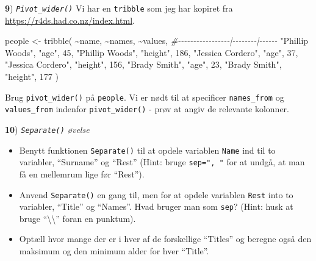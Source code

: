 \documentclass[
]{book}
\newenvironment{Shaded}{\begin{snugshade}}{\end{snugshade}}
\newcommand{\CommentTok}[1]{\textcolor[rgb]{0.56,0.35,0.01}{\textit{#1}}}
\newcommand{\DecValTok}[1]{\textcolor[rgb]{0.00,0.00,0.81}{#1}}
\newcommand{\FunctionTok}[1]{\textcolor[rgb]{0.00,0.00,0.00}{#1}}
\newcommand{\NormalTok}[1]{#1}
\newcommand{\OtherTok}[1]{\textcolor[rgb]{0.56,0.35,0.01}{#1}}
\newcommand{\SpecialCharTok}[1]{\textcolor[rgb]{0.00,0.00,0.00}{#1}}
\newcommand{\StringTok}[1]{\textcolor[rgb]{0.31,0.60,0.02}{#1}}
\begin{document}
\textbf{9}) \emph{\texttt{Pivot\_wider()}} Vi har en \texttt{tribble} som jeg har kopiret fra \url{https://r4ds.had.co.nz/index.html}.

\begin{Shaded}
\begin{Highlighting}[]
\NormalTok{people }\OtherTok{\textless{}{-}} \FunctionTok{tribble}\NormalTok{(}
  \SpecialCharTok{\textasciitilde{}}\NormalTok{name,             }\SpecialCharTok{\textasciitilde{}}\NormalTok{names,  }\SpecialCharTok{\textasciitilde{}}\NormalTok{values,}
  \CommentTok{\#{-}{-}{-}{-}{-}{-}{-}{-}{-}{-}{-}{-}{-}{-}{-}{-}{-}|{-}{-}{-}{-}{-}{-}{-}{-}|{-}{-}{-}{-}{-}{-}}
  \StringTok{"Phillip Woods"}\NormalTok{,   }\StringTok{"age"}\NormalTok{,       }\DecValTok{45}\NormalTok{,}
  \StringTok{"Phillip Woods"}\NormalTok{,   }\StringTok{"height"}\NormalTok{,   }\DecValTok{186}\NormalTok{,}
  \StringTok{"Jessica Cordero"}\NormalTok{, }\StringTok{"age"}\NormalTok{,       }\DecValTok{37}\NormalTok{,}
  \StringTok{"Jessica Cordero"}\NormalTok{, }\StringTok{"height"}\NormalTok{,   }\DecValTok{156}\NormalTok{,}
  \StringTok{"Brady Smith"}\NormalTok{,     }\StringTok{"age"}\NormalTok{,       }\DecValTok{23}\NormalTok{,}
  \StringTok{"Brady Smith"}\NormalTok{,     }\StringTok{"height"}\NormalTok{,   }\DecValTok{177}
\NormalTok{)}
\end{Highlighting}
\end{Shaded}

Brug \texttt{pivot\_wider()} på \texttt{people}. Vi er nødt til at specificer \texttt{names\_from} og \texttt{values\_from} indenfor \texttt{pivot\_wider()} - prøv at angiv de relevante kolonner.

\textbf{10}) \emph{\texttt{Separate()} øvelse}

\begin{itemize}
\item
  Benytt funktionen \texttt{Separate()} til at opdele variablen \texttt{Name} ind til to variabler, ``Surname'' og ``Rest'' (Hint: bruge \texttt{sep=",\ "} for at undgå, at man få en mellemrum lige før ``Rest'').
\item
  Anvend \texttt{Separate()} en gang til, men for at opdele variablen \texttt{Rest} into to variabler, ``Title'' og ``Names''. Hvad bruger man som \texttt{sep}? (Hint: husk at bruge ``\textbackslash\textbackslash{}'' foran en punktum).
\item
  Optæll hvor mange der er i hver af de forskellige ``Titles'' og beregne også den maksimum og den minimum alder for hver ``Title''.
\end{itemize}
\end{document}
